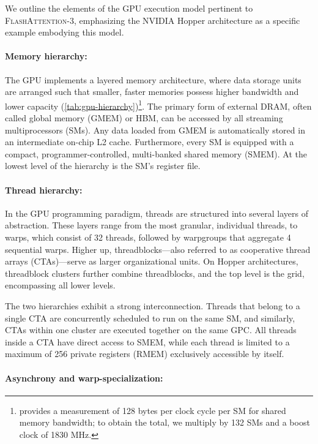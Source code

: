 \begin{enumerate}
We outline the elements of the GPU execution model pertinent to \textsc{FlashAttention-3}, emphasizing the NVIDIA Hopper architecture as a specific example embodying this model.

\paragraph{Memory hierarchy:} The GPU implements a layered memory architecture, where data storage units are arranged such that smaller, faster memories possess higher bandwidth and lower capacity (\cref{tab:gpu-hierarchy})\footnote{\citet{luo2024benchmarking} provides a measurement of 128 bytes per clock cycle per SM for shared memory bandwidth; to obtain the total, we multiply by 132 SMs and a boost clock of 1830 MHz.}. The primary form of external DRAM, often called global memory (GMEM) or HBM, can be accessed by all streaming multiprocessors (SMs). Any data loaded from GMEM is automatically stored in an intermediate on-chip L2 cache. Furthermore, every SM is equipped with a compact, programmer-controlled, multi-banked shared memory (SMEM). At the lowest level of the hierarchy is the SM’s register file.

\paragraph{Thread hierarchy:} In the GPU programming paradigm, threads are structured into several layers of abstraction. These layers range from the most granular, individual threads, to warps, which consist of 32 threads, followed by warpgroups that aggregate 4 sequential warps. Higher up, threadblocks—also referred to as cooperative thread arrays (CTAs)—serve as larger organizational units. On Hopper architectures, threadblock clusters further combine threadblocks, and the top level is the grid, encompassing all lower levels.

The two hierarchies exhibit a strong interconnection. Threads that belong to a single CTA are concurrently scheduled to run on the same SM, and similarly, CTAs within one cluster are executed together on the same GPC. All threads inside a CTA have direct access to SMEM, while each thread is limited to a maximum of 256 private registers (RMEM) exclusively accessible by itself.

\paragraph{Asynchrony and warp-specialization:}


\end{enumerate}
